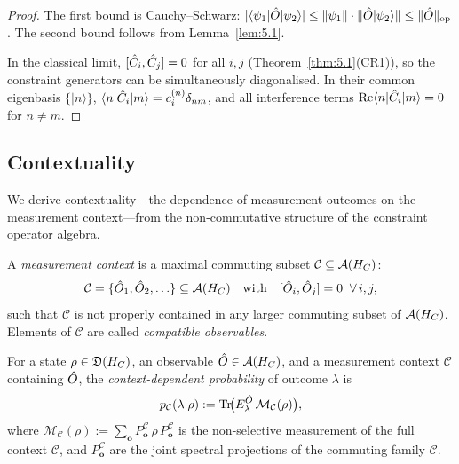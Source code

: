 \begin{proof}
The first bound is Cauchy--Schwarz:
$|\langle\psi_1|\hat{O}|\psi_2\rangle| \leq
\|\psi_1\|\cdot\|\hat{O}|\psi_2\rangle\|
\leq \|\hat{O}\|_{\mathrm{op}}$.
The second bound follows from Lemma~\ref{lem:5.1}.

In the classical limit, $[\hat{C}_i, \hat{C}_j] = 0$ for all $i,j$
(Theorem~\ref{thm:5.1}(CR1)), so the constraint generators can be
simultaneously diagonalised.  In their common eigenbasis $\{|n\rangle\}$,
$\langle n|\hat{C}_i|m\rangle = c_i^{(n)}\delta_{nm}$, and all
interference terms $\mathrm{Re}\langle n|\hat{C}_i|m\rangle = 0$ for
$n \neq m$.
\end{proof}

\subsection{Contextuality}
\label{sec:ch8:contextuality}

We derive contextuality—the dependence of measurement outcomes on the
measurement context—from the non-commutative structure of the constraint
operator algebra.

\begin{definition}
\label{def:8.14}
A \emph{measurement context} is a maximal commuting subset
$\mathcal{C} \subseteq \mathcal{A}(H_C)$:
\[
  \mathcal{C} = \{\hat{O}_1, \hat{O}_2, \ldots\} \subseteq \mathcal{A}(H_C)
  \quad\text{with}\quad
  [\hat{O}_i, \hat{O}_j] = 0 \;\;\forall\, i,j,
\]
such that $\mathcal{C}$ is not properly contained in any larger
commuting subset of $\mathcal{A}(H_C)$.  Elements of $\mathcal{C}$ are
called \emph{compatible observables}.
\end{definition}

\begin{definition}
\label{def:8.15}
For a state $\rho \in \mathfrak{D}(H_C)$, an observable
$\hat{O} \in \mathcal{A}(H_C)$, and a measurement context $\mathcal{C}$ containing
$\hat{O}$, the \emph{context-dependent probability} of outcome
$\lambda$ is
\[
  p_{\mathcal{C}}(\lambda | \rho) :=
  \mathrm{Tr}\!\bigl(E^{\hat{O}}_\lambda\,
    \mathcal{M}_\mathcal{C}(\rho)\bigr),
\]
where $\mathcal{M}_\mathcal{C}(\rho) := \sum_\mathbf{o}
P_\mathbf{o}^{\mathcal{C}}\,\rho\,P_\mathbf{o}^{\mathcal{C}}$ is the
non-selective measurement of the full context $\mathcal{C}$, and
$P_\mathbf{o}^{\mathcal{C}}$ are the joint spectral projections of the
commuting family $\mathcal{C}$.
\end{definition}

